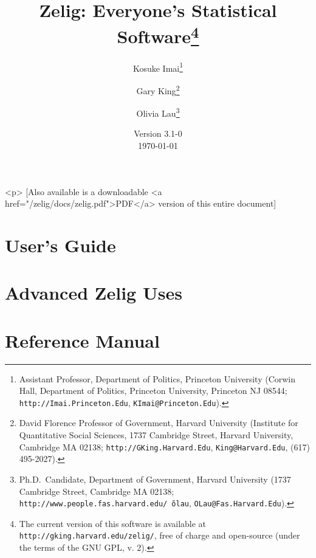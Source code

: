 
\title{Zelig: Everyone's Statistical Software\thanks{The current
    version of this software is available at
    \texttt{http://gking.harvard.edu/zelig/}, free of charge and
    open-source (under the terms of the GNU GPL, v. 2).}}
\author{Kosuke
  Imai\thanks{Assistant Professor, Department of Politics, Princeton
    University (Corwin Hall, Department of Politics, Princeton
    University, Princeton NJ 08544; \texttt{http://Imai.Princeton.Edu},
    \texttt{KImai@Princeton.Edu}).}
\and %
Gary King\thanks{David Florence Professor of Government, Harvard
  University (Institute for Quantitative Social Sciences, 1737 Cambridge 
Street, Harvard University, Cambridge MA 02138;
  \texttt{http://GKing.Harvard.Edu}, \texttt{King@Harvard.Edu}, (617)
  495-2027).}
\and %
Olivia Lau\thanks{Ph.D.\ Candidate, Department of Government, Harvard
  University (1737 Cambridge Street, Cambridge MA 02138;
  \texttt{http://www.people.fas.harvard.edu/\~\,olau},
  \texttt{OLau@Fas.Harvard.Edu}).}}

\date{Version 3.1-0\\ \today}


\maketitle
\begin{rawhtml}
  <p>
  [Also available is a downloadable <a href="/zelig/docs/zelig.pdf">PDF</a>
  version of this entire document]
\end{rawhtml}

\tableofcontents

\nobibliography*





\part[User's Guide]{User's Guide}






\part{Advanced Zelig Uses}





\part{Reference Manual}

